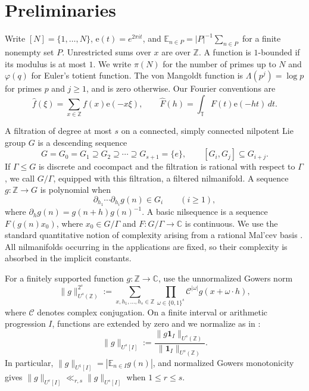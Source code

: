 \documentclass[12pt]{amsart}
\newcommand{\E}{\mathbb E}
\newcommand{\Z}{\mathbb Z}
\newcommand{\C}{\mathbb C}
\newcommand{\1}{\mathbf 1}
\newcommand{\e}{\mathrm e}
\theoremstyle{definition}
\begin{document}
\section{Preliminaries}\label{s:preliminaries}


Write \([N]=\{1,\ldots,N\}\), \(\e(t)=e^{2\pi i t}\), and
\(\E_{n\in P}=|P|^{-1}\sum_{n\in P}\) for a finite nonempty set \(P\).
Unrestricted sums over \(x\) are over \(\Z\).  A function is
\(1\)-bounded if its modulus is at most \(1\).
We write $\pi(N)$ for the number of primes up to $N$ and
$\varphi(q)$ for Euler's totient function. The von Mangoldt
function is $\Lambda(p^j)=\log p$ for primes $p$ and $j\geq1$,
and is zero otherwise. Our Fourier conventions are
\[
 \widehat f(\xi)=\sum_{x\in\mathbb Z}f(x)\e(-x\xi),
 \qquad
 \widehat F(h)=\int_{\mathbb T}F(t)\e(-ht)\,dt.
\]

A filtration of degree at most \(s\) on a connected, simply connected
nilpotent Lie group \(G\) is a descending sequence
\[
 G=G_0=G_1\supseteq G_2\supseteq\cdots\supseteq G_{s+1}=\{e\},
 \qquad [G_i,G_j]\subseteq G_{i+j}.
\]
If \(\Gamma\le G\) is discrete and cocompact and the filtration is
rational with respect to \(\Gamma\), we call \(G/\Gamma\), equipped with
this filtration, a filtered nilmanifold.  A sequence \(g:\Z\to G\) is
polynomial when
\[
 \partial_{h_1}\cdots\partial_{h_i}g(n)\in G_i
 \qquad(i\ge1),
\]
where \(\partial_hg(n)=g(n+h)g(n)^{-1}\).  A basic nilsequence is a
sequence \(F(g(n)x_0)\), where \(x_0\in G/\Gamma\) and
\(F:G/\Gamma\to\C\) is continuous.  We use the standard quantitative
notion of complexity arising from a rational Mal'cev basis
\cite[Section~2]{GreenTaoNil}.  All
nilmanifolds occurring in the applications are fixed, so their complexity
is absorbed in the implicit constants.

For a finitely supported function \(g:\mathbb Z\to\mathbb C\), use the
unnormalized Gowers norm
\[
 \|g\|_{U^s(\mathbb Z)}^{2^s}
 :=\sum_{x,h_1,\ldots,h_s\in\mathbb Z}
   \prod_{\omega\in\{0,1\}^s}
   \mathcal C^{|\omega|}g(x+\omega\cdot h),
\]
where \(\mathcal C\) denotes complex conjugation.  On a finite interval or arithmetic progression
\(I\), functions are extended by zero and we normalize as in
\cite[Section~2.3]{KMTT}:
\begin{equation}\label{e:normalized-gowers}
 \|g\|_{U^s[I]}
 :=\frac{\|g\mathbf1_I\|_{U^s(\mathbb Z)}}
          {\|\mathbf1_I\|_{U^s(\mathbb Z)}}.
\end{equation}
In particular, \(\|g\|_{U^1[I]}=|\mathbb E_{n\in I}g(n)|\), and
normalized Gowers monotonicity gives
\(\|g\|_{U^r[I]}\ll_{r,s}\|g\|_{U^s[I]}\) when \(1\le r\le s\).
\end{document}
